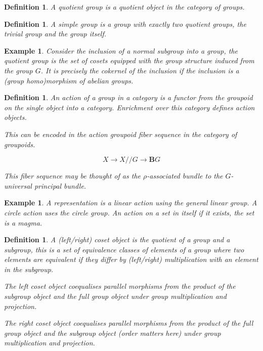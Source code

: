 \documentclass{tufte-book}
\newtheorem{definition}[theorem]{Definition}
\newtheorem{example}[theorem]{Example}
\begin{document}
\begin{definition}
  A quotient group is a quotient object in the category of groups.
\end{definition}

\begin{definition}
  A simple group is a group with exactly two quotient groups, the trivial group and the group itself.
\end{definition}

\begin{example}
  Consider the inclusion of a normal subgroup into a group, the quotient group is the set of cosets equipped with the group structure induced from the group $G$. It is precisely the cokernel of the inclusion if the inclusion is a (group homo)morphism of abelian groups.
\end{example}

\begin{definition}
  An action of a group in a category is a functor from the groupoid on the single object into a category.
  Enrichment over this category defines action objects.

  This can be encoded in the action groupoid fiber sequence in the category of groupoids.

  \begin{equation}
    X \rightarrow X // G \rightarrow \mathbf{B}G
  \end{equation}

  This fiber sequence may be thought of as the $\rho$-associated bundle to the $G$-universal principal bundle.
\end{definition}

\begin{example}
  A representation is a linear action using the general linear group. A circle action uses the circle group. An action on a set in itself if it exists, the set is a magma.
\end{example}

\begin{definition}
  A (left/right) coset object is the quotient of a group and a subgroup, this is a set of equivalence classes of elements of a group where two elements are equivalent if they differ by (left/right) multiplication with an element in the subgroup.

  The left coset object coequalises parallel morphisms from the product of the subgroup object and the full group object under group multiplication and projection.

  The right coset object coequalises parallel morphisms from the product of the full group object and the subgroup object (order matters here) under group multiplication and projection.
\end{definition}
\end{document}

